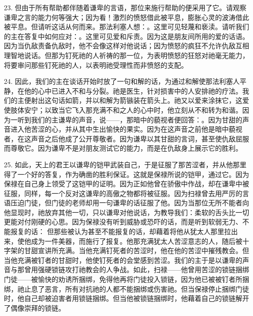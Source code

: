 23. 但由于所有帮助都伴随着谦卑的言语，那位来施行帮助的便采用了它。请观察谦卑之言的能力何等强大；因为看！激烈的愤怒借此被平息，膨胀心灵的波涛借此被平息。但请听这话从何而来。那法利塞人想：。这里可见轻蔑和亵渎。请听我们的主在答复中如何应对：。这里可见爱和斥责。因为这是朋友间所用的爱的话语。因为当仇敌责备仇敌时，他不会像这样对他说话；因为愤怒的疯狂不允许仇敌互相理智地说话。但那为钉死祂的人祈祷的那一位，为表明愤怒的狂怒对祂毫无能力，将要审问那些钉死祂的人，以表明祂受理性而非愤怒的支配。\par

24. 因此，我们的主在谈话开始时放了一句和解的话，为通过和解使那法利塞人平静，在他的心中已进入不和与分裂。祂是医生，针对损害中的人安排祂的疗法。我们的主便射出这句话如箭，并以和解为箭镞装在箭头上。祂又以爱来涂抹它，这爱使肢体安宁；以致当它飞入那充满不和之人的心中时，他立刻从不和转为和谐。因为一听到我们的主谦卑的声音，说——，那暗中的藐视者便回答：。因为甘甜的声音进入他苦涩的心，并从其中生出愉快的果实。因为在这声音之前他是暗中藐视者，在这声音之后他成了公开尊敬者。因为谦卑以其甘甜的言词，甚至使仇敌屈服而尊敬它。因为谦卑不是对朋友测试它的能力，而是在仇敌身上展示它的胜利。\par

25. 如此，天上的君王以谦卑的铠甲武装自己，于是征服了那苦涩者，并从他那里得了一个好的答复，作为确凿的胜利保证。这就是保禄所说的铠甲，通过它。因为保禄在自己身上领受了这铠甲的证明。因为正如他曾在骄傲中作战，却在谦卑中被征服，同样，每一个反对这谦卑的高傲之物都将被征服。因为扫禄曾去用严厉的言语压迫门徒，但门徒的老师却用一句谦卑的话征服了他。因为当那位无所不能者向他显现时，祂放弃其他一切，只以谦卑对他说话，为教导我们：柔软的舌头比一切更能对付刚硬的心思。因为保禄没有听到威胁或恐吓的话，而是听到软弱无力、不能报复的话： 但那些被认为甚至不能报复的话，却藉着将他从犹太人那里拉出来，使他成为一件美器，而施行了报复。他那充满犹太人苦涩意志的人，随后被十字架的甘甜宣讲所充满。当他充满钉死者的苦涩时，他在他的苦涩中摧残教会。但当他充满被钉者的甘甜时，他使钉死者的会堂感到苦涩。我们的主于是以谦卑的声音与那曾用强硬锁链攻打祂教会的人争战。如此，扫禄——他曾用苦涩的锁链捆绑门徒——被愉快的劝诱所捆绑，免得他再将门徒投入锁链，因为他已被被钉者所捆绑，祂止息了恶言，所有对抗祂的人都不能捆绑或伤害祂。但当保禄停止捆绑门徒时，他自己却被迫害者用锁链捆绑。但当他被锁链捆绑时，他藉着自己的锁链解开了偶像崇拜的锁链。\par

